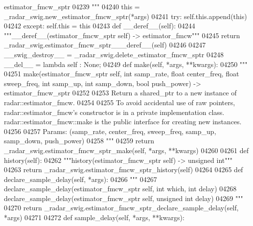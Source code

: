 \begin{DoxyCode}
{{{{{{{{{{{{{{{{       estimator\_fmcw\_sptr}
04239 \textcolor{stringliteral}{        """}
04240         this = \_radar\_swig.new\_estimator\_fmcw\_sptr(*args)
04241         \textcolor{keywordflow}{try}: self.this.append(this)
04242         \textcolor{keywordflow}{except}: self.this = this
04243     \textcolor{keyword}{def }__deref__(self):
04244         \textcolor{stringliteral}{"""\_\_deref\_\_(estimator\_fmcw\_sptr self) -> estimator\_fmcw"""}
04245         \textcolor{keywordflow}{return} \_radar\_swig.estimator\_fmcw\_sptr\_\_\_deref\_\_(self)
04246 
04247     \_\_swig\_destroy\_\_ = \_radar\_swig.delete\_estimator\_fmcw\_sptr
04248     \_\_del\_\_ = \textcolor{keyword}{lambda} self : \textcolor{keywordtype}{None};
04249     \textcolor{keyword}{def }make(self, *args, **kwargs):
04250         \textcolor{stringliteral}{"""}
04251 \textcolor{stringliteral}{        make(estimator\_fmcw\_sptr self, int samp\_rate, float center\_freq, float sweep\_freq, int samp\_up, int
       samp\_down, bool push\_power) -> estimator\_fmcw\_sptr}
04252 \textcolor{stringliteral}{}
04253 \textcolor{stringliteral}{        Return a shared\_ptr to a new instance of radar::estimator\_fmcw.}
04254 \textcolor{stringliteral}{}
04255 \textcolor{stringliteral}{        To avoid accidental use of raw pointers, radar::estimator\_fmcw's constructor is in a private
       implementation class. radar::estimator\_fmcw::make is the public interface for creating new instances.}
04256 \textcolor{stringliteral}{}
04257 \textcolor{stringliteral}{        Params: (samp\_rate, center\_freq, sweep\_freq, samp\_up, samp\_down, push\_power)}
04258 \textcolor{stringliteral}{        """}
04259         \textcolor{keywordflow}{return} \_radar\_swig.estimator\_fmcw\_sptr\_make(self, *args, **kwargs)
04260 
04261     \textcolor{keyword}{def }history(self):
04262         \textcolor{stringliteral}{"""history(estimator\_fmcw\_sptr self) -> unsigned int"""}
04263         \textcolor{keywordflow}{return} \_radar\_swig.estimator\_fmcw\_sptr\_history(self)
04264 
04265     \textcolor{keyword}{def }declare_sample_delay(self, *args):
04266         \textcolor{stringliteral}{"""}
04267 \textcolor{stringliteral}{        declare\_sample\_delay(estimator\_fmcw\_sptr self, int which, int delay)}
04268 \textcolor{stringliteral}{        declare\_sample\_delay(estimator\_fmcw\_sptr self, unsigned int delay)}
04269 \textcolor{stringliteral}{        """}
04270         \textcolor{keywordflow}{return} \_radar\_swig.estimator\_fmcw\_sptr\_declare\_sample\_delay(self, *args)
04271 
04272     \textcolor{keyword}{def }sample_delay(self, *args, **kwargs):
}}}}}}}}}}}}}}}
\end{DoxyCode}
